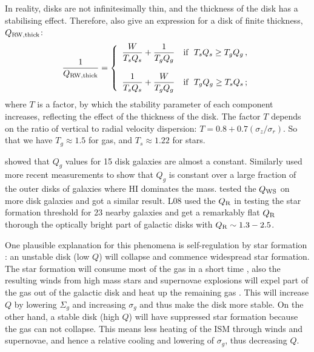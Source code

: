 \documentclass[12pt,preprint]{aastex}
\begin{document}
In reality, disks are not infinitesimally thin, and the thickness of the disk has a  stabilising effect.
Therefore, \citet{rom11} also give an expression for a disk of finite thickness, 
 $Q_{\rm RW,thick}$:
\begin{equation}
\label{rwthick}
\frac{1}{Q_{\rm RW,thick}}=
\left\{\begin{array}{ll}
       {\displaystyle\frac{W}{T_{s}Q_{s}}+
                     \frac{1}{T_{g}Q_{g}}}
                       & \mbox{if\ \ }T_{s}Q_s \geq
                                      T_{g}Q_{g}\,, \\
                       &                                              \\
       {\displaystyle\frac{1}{T_sQ_s}+
                     \frac{W}{T_{g}Q_{g}}}
                       & \mbox{if\ \ }T_{g}Q_g \geq
                                      T_sQ_s\,;
       \end{array}
\right.
\label{Qrw2}
\end{equation}
where $T$ is a factor, by which the stability parameter of each component increases, reflecting the effect of the thickness of the disk. The factor $T$ depends on the ratio of vertical to radial velocity dispersion: $T= 0.8+0.7(\sigma_z / \sigma_r)$. So that we have $T_g\approx 1.5$ for gas, and $T_s\approx1.22$ for stars.

\citet{ken89} showed that $Q_g$ values for 15 disk galaxies are almost a constant. Similarly \citet{meu13} used more recent measurements to show that $Q_g$ is constant over a large fraction of the outer disks of galaxies where HI  dominates the mass.   \citet{boi03, mar01} tested the \citet{wan94} $Q_{\rm WS}$ on more disk galaxies and got a similar result.  L08 used the \citet{raf01} $Q_{\rm R}$ in testing the star formation threshold for 23 nearby galaxies and get a remarkably flat $Q_{\rm R}$ thorough the optically bright  part of galactic disks with $Q_{\rm R} \sim 1.3-2.5$.  

One plausible explanation for this phenomena is self-regulation by star
formation \citep{bur92, elm11}: an unstable disk (low $Q$) will collapse
and commence widespread star formation. 
The star formation will consume most of the gas in a short time \citep{qui72}, 
also the resulting winds from high mass stars and supernovae explosions 
will expel part of the gas out of the galactic disk \citep{dut09a,hec90} 
and heat up the remaining gas \citep{tam09}. This will increase  $Q$ by lowering $\Sigma_g$ and increasing $\sigma_g$ and thus make the disk more stable. On the other hand, a stable disk (high $Q$) will have 
suppressed star formation because the gas can not collapse.  This means less heating of the ISM through winds and supernovae, and hence a relative cooling and lowering of $\sigma_g$, thus decreasing $Q$. 
\end{document}
